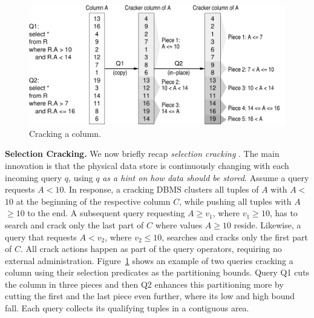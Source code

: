 \begin{figure}[t]
\includegraphics[width=.95\columnwidth]{CrackExample.pdf}
\vspace{-1em}
\caption{Cracking a column.}
\vspace{-2em}
\label{F:CrackExample}
\end{figure}

\textbf{Selection Cracking.}
We now briefly recap \emph{selection cracking} \cite{IKM:CIDR07}.
The main innovation is that the physical
data store is continuously changing with each incoming query $q$, using $q$
\emph{as a hint on how data should be stored}.
Assume a query requests $A$$<$$10$.
In response, a cracking DBMS clusters all tuples of $A$ with
$A$$<$$10$ at the beginning of the respective column $C$,
while pushing all tuples with $A$$\geq$$10$ to the end.
A subsequent query requesting $A$$\geq$$v_1$, where $v_1$$\geq$$10$,
has to search and crack only the last part of $C$ where values $A$$\geq$$10$ reside.
Likewise, a query that requests $A$$<$$v_2$, where $v_2$$\leq$$10$,
searches and cracks only the first part of $C$.
All crack actions happen as part of the query operators, requiring no external administration.
Figure~\ref{F:CrackExample} shows an example of two queries cracking a column
using their selection predicates as the partitioning bounds. Query Q1 cuts the column
in three pieces and then Q2 enhances this partitioning more by cutting the first and
the last piece even further, where its low and high bound fall.
Each query collects its qualifying tuples in a contiguous area.


